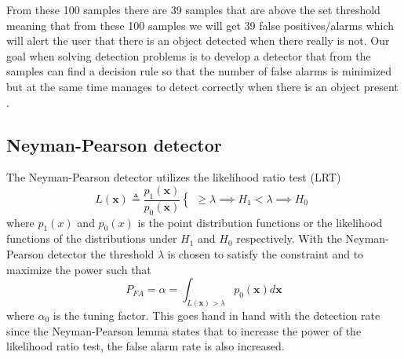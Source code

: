 From these 100 samples there are 39 samples that are above the set threshold meaning that from these 100 samples we will get 39 false positives/alarms which will alert the user that there is an object detected when there really is not. Our goal when solving detection problems is to develop a detector that from the samples can find a decision rule so that the number of false alarms is minimized but at the same time manages to detect correctly when there is an object present \cite{Myrvoll2020}.\\

\subsection{Neyman-Pearson detector}
The Neyman-Pearson detector utilizes the likelihood ratio test (LRT)
\begin{equation}
	L(\mathbf{x}) \triangleq \frac{p_1(\mathbf{x})}{p_0(\mathbf{x})} 
		\begin{cases}
			\geq \lambda \implies H_1
			< \lambda \implies H_0
		\end{cases} 
\end{equation}
where $p_1(x)$ and $p_0(x)$ is the point distribution functions or the likelihood functions of the distributions under $H_1$ and $H_0$ respectively.
With the Neyman-Pearson detector the threshold $\lambda$ is chosen to satisfy the constraint and to maximize the power such that
\begin{equation}
	P_{FA} = \alpha = \int_{L(\mathbf{x})>\lambda}p_0(\mathbf{x})d\mathbf{x}
\end{equation}
where $\alpha_0$ is the tuning factor. This goes hand in hand with the detection rate since the Neyman-Pearson lemma states that to increase the power of the likelihood ratio test, the false alarm rate is also increased.
